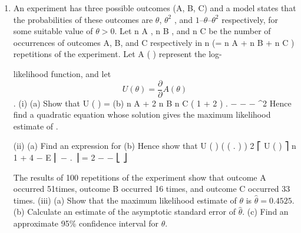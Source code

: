 \documentclass[a4paper,12pt]{article}
\begin{document}
\begin{enumerate}
\item An experiment has three possible outcomes (A, B, C) and a model states that the
probabilities of these outcomes are $\theta$, $\theta^2$ , and $1 – \theta – \theta^2$ respectively, for some suitable
value of $\theta > 0$.
Let n A , n B , and n C be the number of occurrences of outcomes A, B, and C respectively
in n (= n A + n B + n C ) repetitions of the experiment. Let A ( \theta ) represent the log-
 
likelihood function, and let \[U ( \theta ) =
\frac{\partial}{\partial} A ( \theta )\]
.
\frac{\partial}{\partial}\theta\]
(i)
(a)
Show that
U ( \theta ) =
(b)
n A + 2 n B n C ( 1 + 2 \theta )
.
−
 − \theta − \theta^2
Hence find a quadratic equation whose solution gives the maximum
likelihood estimate of \theta.

(ii)
(a) Find an expression for
(b) Hence show that
\frac{\partial}{\partial} U ( \theta )
\frac{\partial}{\partial}\theta
(
(
.
)
)
2
⎡ \frac{\partial}{\partial} U ( \theta ) ⎤ n 1 + 4 \theta − \theta
E ⎢ −
.
⎥ =
2
\frac{\partial}{\partial}\theta
\theta
−
\theta
−
⎣
⎦

The results of 100 repetitions of the experiment show that outcome A occurred
51times, outcome B occurred 16 times, and outcome C occurred 33 times.
(iii)
(a) Show that the maximum likelihood estimate of $\theta$ is $\hat{\theta}= 0.4525$.
(b) Calculate an estimate of the asymptotic standard error of $\hat{\theta}$.
(c) Find an approximate 95\% confidence interval for $\theta$.




\end{enumerate}
\end{document}
